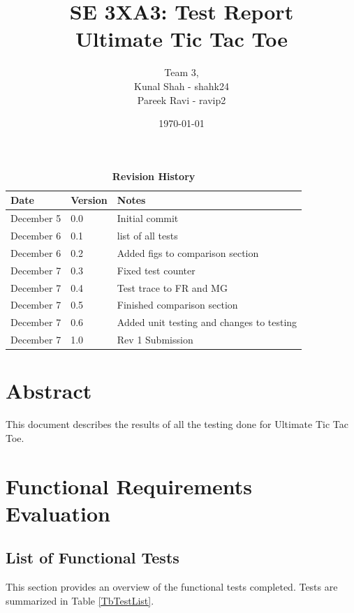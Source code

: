 \documentclass[12pt, titlepage]{article}
\title{SE 3XA3: Test Report\\Ultimate Tic Tac Toe}
\author{Team 3,
		\\ Kunal Shah - shahk24
		\\ Pareek Ravi - ravip2
}
\date{\today}
\begin{document}

\maketitle

\tableofcontents
\listoftables
\listoffigures

\newpage
\begin{table}[hp]
\caption{\bf Revision History}
\begin{tabularx}{\textwidth}{p{3cm}p{2cm}X}
\toprule {\bf Date} & {\bf Version} & {\bf Notes}\\
\midrule
December 5 & 0.0 & Initial commit\\
December 6 & 0.1 & list of all tests\\
December 6 & 0.2 & Added figs to comparison section\\
December 7 & 0.3 & Fixed test counter\\
December 7 & 0.4 & Test trace to FR and MG\\
December 7 & 0.5 & Finished comparison section\\
December 7 & 0.6 & Added unit testing and changes to testing\\
December 7 & 1.0 & Rev 1 Submission\\

\bottomrule
\end{tabularx}
\end{table}

\newpage


\section*{Abstract}
This document describes the results of all the testing done for Ultimate Tic Tac Toe.

\section{Functional Requirements Evaluation}
\subsection* {List of Functional Tests}

This section provides an overview of the functional tests completed. Tests are summarized in Table \ref{TbTestList}. 
\end{document}
